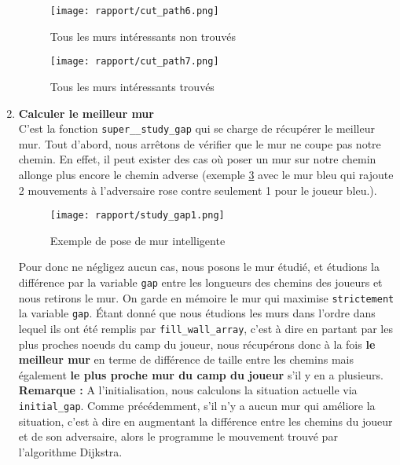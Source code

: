 \documentclass[a4paper]{article}
\begin{document}
\begin{enumerate}
\clearpage
\begin{figure}[ht!]
    \centering
    \texttt{[image: rapport/cut\_path6.png]}
    \caption{Tous les murs intéressants non trouvés}
    \label{fig:cut_path6}
\end{figure}

\begin{figure}[ht!]
    \centering
    \texttt{[image: rapport/cut\_path7.png]}
    \caption{Tous les murs intéressants trouvés}
    \label{fig:cut_path7}
\end{figure}

    \item \textbf{Calculer le meilleur mur} \\
C'est la fonction \texttt{super\_\_study\_gap} qui se charge de récupérer le meilleur mur. Tout d'abord, nous arrêtons de vérifier que le mur ne coupe pas notre chemin. En effet, il peut exister des cas où poser un mur sur notre chemin allonge plus encore le chemin adverse (exemple \ref{fig:study_gap1} avec le mur bleu qui rajoute 2 mouvements à l'adversaire rose contre seulement 1 pour le joueur bleu.). \\
    
\begin{figure}[ht!]
    \centering
    \texttt{[image: rapport/study\_gap1.png]}
    \caption{Exemple de pose de mur intelligente}
    \label{fig:study_gap1}
\end{figure}

Pour donc ne négligez aucun cas, nous posons le mur étudié, et étudions la différence par la variable \texttt{gap} entre les longueurs des chemins des joueurs et nous retirons le mur. On garde en mémoire le mur qui maximise \texttt{strictement} la variable \texttt{gap}. Étant donné que nous étudions les murs dans l'ordre dans lequel ils ont été remplis par \texttt{fill\_wall\_array}, c'est à dire en partant par les plus proches noeuds du camp du joueur, nous récupérons donc à la fois \textbf{le meilleur mur} en terme de différence de taille entre les chemins mais également \textbf{le plus proche mur du camp du joueur} s'il y en a plusieurs. \\

\textbf{Remarque :} A l'initialisation, nous calculons la situation actuelle via \texttt{initial\_gap}. Comme précédemment, s'il n'y a aucun mur qui améliore la situation, c'est à dire en augmentant la différence entre les chemins du joueur et de son adversaire, alors le programme le mouvement trouvé par l'algorithme Dijkstra.
    
\end{enumerate}
 
\end{document}
